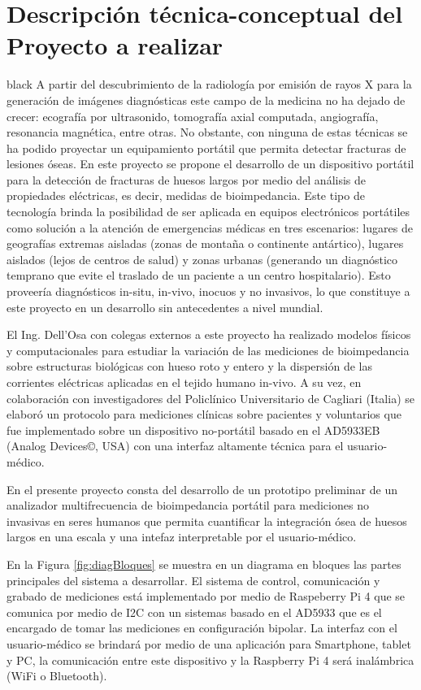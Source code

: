 \documentclass[11pt]{charter}
\begin{document}
\section{Descripción técnica-conceptual del Proyecto a realizar}
\label{sec:descripcion}

\begin{consigna}{black}
A partir del descubrimiento de la radiología por emisión de rayos X para la generación de imágenes diagnósticas este campo de la medicina no ha dejado de crecer: ecografía por ultrasonido, tomografía axial computada, angiografía, resonancia magnética, entre otras. No obstante, con ninguna de estas técnicas se ha podido proyectar un equipamiento portátil que permita detectar fracturas de lesiones óseas. 
En este proyecto se propone el desarrollo de un dispositivo portátil para la detección de fracturas de huesos largos por medio del análisis de propiedades eléctricas, es decir, medidas de bioimpedancia. Este tipo de tecnología brinda la posibilidad de ser aplicada en equipos electrónicos portátiles como solución a la atención de emergencias médicas en tres escenarios: lugares de geografías extremas aisladas (zonas de montaña o continente antártico), lugares aislados (lejos de centros de salud) y zonas urbanas (generando un diagnóstico temprano que evite el traslado de un paciente a un centro hospitalario). Esto proveería diagnósticos in-situ, in-vivo, inocuos y no invasivos, lo que constituye a este proyecto en un desarrollo sin antecedentes a nivel mundial.

El Ing. Dell'Osa con colegas externos a este proyecto ha realizado modelos físicos y computacionales para estudiar la variación de las mediciones de bioimpedancia sobre estructuras biológicas con hueso roto y entero y la dispersión de las corrientes eléctricas aplicadas en el tejido humano in-vivo. A su vez, en colaboración con investigadores del Policlínico Universitario de Cagliari (Italia) se elaboró un protocolo para mediciones clínicas sobre pacientes y voluntarios que fue implementado sobre un dispositivo no-portátil basado en el AD5933EB (Analog Devices©, USA) con una interfaz altamente técnica para el usuario-médico.

En el presente proyecto consta del desarrollo de un prototipo preliminar de un analizador multifrecuencia de bioimpedancia portátil para mediciones no invasivas en seres humanos que permita cuantificar la integración ósea de huesos largos en una escala y una intefaz interpretable por el usuario-médico.

En la Figura \ref{fig:diagBloques} se muestra en un diagrama en bloques las partes principales del sistema a desarrollar. El sistema de control, comunicación y grabado de mediciones está implementado por medio de Raspeberry Pi 4 que se comunica por medio de I2C con un sistemas basado en el AD5933 que es el encargado de tomar las mediciones en configuración bipolar. La interfaz con el usuario-médico se brindará por medio de una aplicación para Smartphone, tablet y PC, la comunicación entre este dispositivo y la Raspberry Pi 4 será inalámbrica (WiFi o Bluetooth).


\end{consigna}
\end{document}
